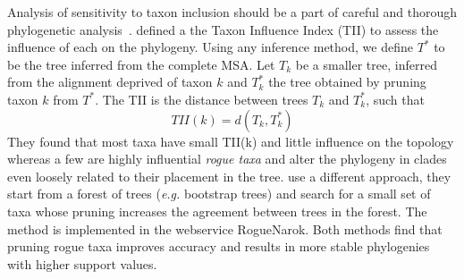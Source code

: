 Analysis of sensitivity to taxon inclusion should be a part of careful and thorough phylogenetic analysis~\citep{Heath2008}. \citet{Mariadassou2012} defined a the Taxon Influence Index (TII) to assess the influence of each on the phylogeny. Using any inference method, we define $T^*$ to be the tree inferred from the complete MSA. Let $T_k$ be a smaller tree, inferred from the
alignment deprived of taxon $k$ and $T_k^*$ the tree obtained by pruning taxon $k$ from $T^*$. 
The TII is the distance between trees $T_k$ and $T_k^*$, such that 
\[
TII(k) = d(T_k , T_k^*) 
\]
They found that most taxa have small TII(k) and little influence on the topology whereas a few are highly influential \emph{rogue taxa} and alter the phylogeny in clades even loosely related to their placement in the tree. \citet{Aberer2013} use a different approach, they start from a forest of trees (\emph{e.g.} bootstrap trees) and search for a small set of taxa whose pruning increases the agreement between trees in the forest. The method is implemented in the webservice RogueNarok. Both methods find that pruning rogue taxa improves accuracy and results in more stable phylogenies with higher support values. 